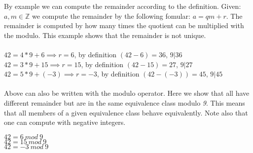  By example we can compute the remainder according to the definition. Given: \begin{math} a, m \in \mathbb{Z} \end{math} we compute the remainder by the following fomular:  \begin{math} a = qm +r \end{math}. The remainder is computed by how many times the quotient can be multiplied with the modulo. This example shows that the remainder is not unique. \\\\
\begin{math}42 = 4 * 9 +6 \implies r = 6 \end{math}, by definition \begin{math} (42-6) = 36 \end{math}, \begin{math} 9| 36 \end{math}\\
\begin{math}42 = 3 * 9 +15 \implies r = 15 \end{math}, by definition \begin{math} (42-15) = 27 \end{math}, \begin{math} 9| 27 \end{math}\\
\begin{math}42 = 5 * 9 +(-3) \implies r = -3 \end{math}, by definition \begin{math} (42-(-3)) = 45 \end{math}, \begin{math} 9| 45 \end{math}\\\\

 Above can also be written with the modulo operator. Here we show that all have different remainder but are in the same equivalence class modulo \textit{9}. This means that all members of a given equivalence class behave equivalently. Note also that one can compute with negative integers.

\begin{center}
\begin{math}42 = 6 \ mod \ 9 \end{math}\\
\begin{math}42 = 15 \ mod \ 9 \end{math}\\
\begin{math}42 = -3 \ mod \ 9 \end{math}\\
\end{center}

